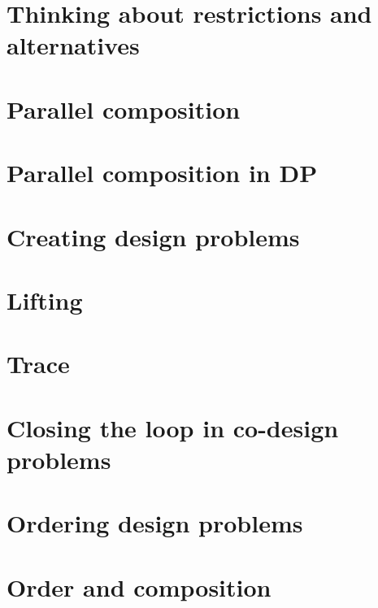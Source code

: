 \documentclass[paper=6in:9in,pagesize=pdftex,
 headinclude=off,footinclude=on,11pt,twoside]{scrbook}
\begin{document}
\chapter{Thinking about restrictions and alternatives}

\clearpage

\chapter{Parallel composition}

\clearpage

\chapter{Parallel composition in DP}

\clearpage

\chapter{Creating design problems}

\clearpage

\chapter{Lifting}

\clearpage

\chapter{Trace}

\clearpage

\chapter{Closing the loop in co-design problems}

\clearpage

\chapter{Ordering design problems}

\clearpage

\chapter{Order and composition}

\clearpage
\end{document}
